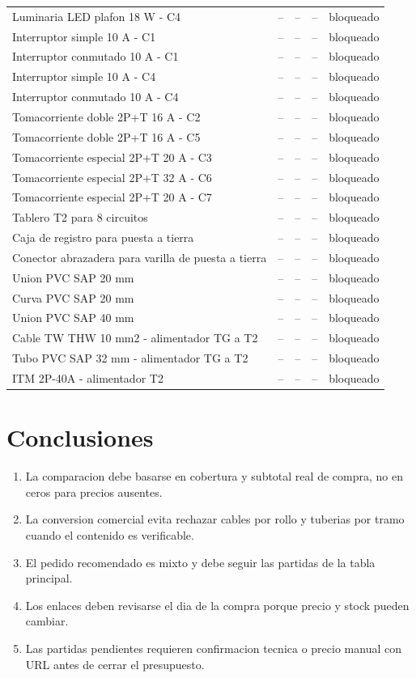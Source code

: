 \documentclass[11pt,a4paper]{article}
\begin{document}
\begin{longtable}{p{} p{} r r p{}}
Luminaria LED plafon 18 W - C4 & -- & -- & -- & bloqueado \\
Interruptor simple 10 A - C1 & -- & -- & -- & bloqueado \\
Interruptor conmutado 10 A - C1 & -- & -- & -- & bloqueado \\
Interruptor simple 10 A - C4 & -- & -- & -- & bloqueado \\
Interruptor conmutado 10 A - C4 & -- & -- & -- & bloqueado \\
Tomacorriente doble 2P+T 16 A - C2 & -- & -- & -- & bloqueado \\
Tomacorriente doble 2P+T 16 A - C5 & -- & -- & -- & bloqueado \\
Tomacorriente especial 2P+T 20 A - C3 & -- & -- & -- & bloqueado \\
Tomacorriente especial 2P+T 32 A - C6 & -- & -- & -- & bloqueado \\
Tomacorriente especial 2P+T 20 A - C7 & -- & -- & -- & bloqueado \\
Tablero T2 para 8 circuitos & -- & -- & -- & bloqueado \\
Caja de registro para puesta a tierra & -- & -- & -- & bloqueado \\
Conector abrazadera para varilla de puesta a tierra & -- & -- & -- & bloqueado \\
Union PVC SAP 20 mm & -- & -- & -- & bloqueado \\
Curva PVC SAP 20 mm & -- & -- & -- & bloqueado \\
Union PVC SAP 40 mm & -- & -- & -- & bloqueado \\
Cable TW THW 10 mm2 - alimentador TG a T2 & -- & -- & -- & bloqueado \\
Tubo PVC SAP 32 mm - alimentador TG a T2 & -- & -- & -- & bloqueado \\
ITM 2P-40A - alimentador T2 & -- & -- & -- & bloqueado \\
\bottomrule\end{longtable}


\section{Conclusiones}
\begin{enumerate}
\item La comparacion debe basarse en cobertura y subtotal real de compra, no en ceros para precios ausentes.
\item La conversion comercial evita rechazar cables por rollo y tuberias por tramo cuando el contenido es verificable.
\item El pedido recomendado es mixto y debe seguir las partidas de la tabla principal.
\item Los enlaces deben revisarse el dia de la compra porque precio y stock pueden cambiar.
\item Las partidas pendientes requieren confirmacion tecnica o precio manual con URL antes de cerrar el presupuesto.
\end{enumerate}
\end{document}
